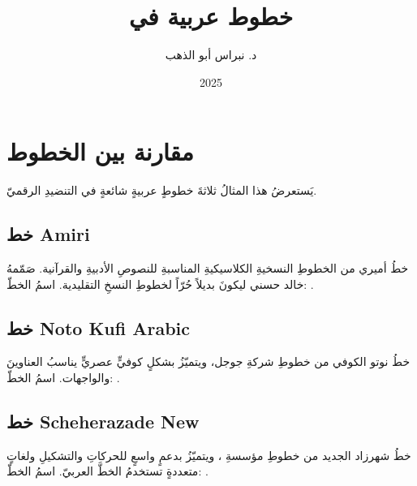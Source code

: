\documentclass[12pt, a4paper]{article}
\begin{document}
\title{خطوط عربية في }
\author{د. نبراس أبو الذهب}
\date{2025}
\maketitle

\section{مقارنة بين الخطوط}

يَستعرضُ هذا المثالُ ثلاثةَ خطوطٍ عربيةٍ شائعةٍ في التنضيدِ الرقميّ.

\subsection{خط Amiri}

{\fontAmiri
خطُ أميري من الخطوطِ النسخيةِ الكلاسيكيةِ المناسبةِ للنصوصِ الأدبيةِ
والقرآنية. صَمّمهُ خالد حسني ليكونَ بديلاً حُرّاً لخطوطِ النسخِ التقليدية.
اسمُ الخطّ: .\par}

\subsection{خط Noto Kufi Arabic}

{\fontNotoKufi
خطُ نوتو الكوفي من خطوطِ شركةِ جوجل، ويتميّزُ بشكلٍ كوفيٍّ عصريٍّ
يناسبُ العناوينَ والواجهات. اسمُ الخطّ: .\par}

\subsection{خط Scheherazade New}

{\fontScheherazade
خطُ شهرزاد الجديد من خطوطِ مؤسسةِ ، ويتميّزُ بدعمٍ واسعٍ
للحركاتِ والتشكيلِ ولغاتٍ متعددةٍ تستخدمُ الخطَّ العربيّ.
اسمُ الخطّ: .\par}
\end{document}

